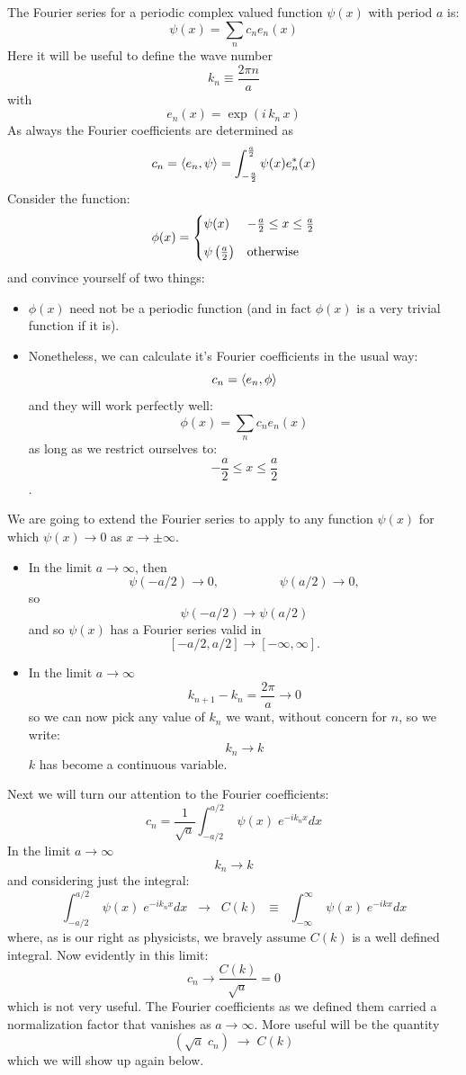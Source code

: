 \documentclass[12pt]{book}
\begin{document}
The Fourier series for a periodic complex valued function $\psi(x)$ with period $a$ is:
\begin{equation*}
\psi(x) = \sum_n c_n e_n(x)
\end{equation*}
Here it will be useful to define the wave number
\begin{equation}
k_n \equiv \frac{2 \pi n}{a}
\end{equation}
with 
$$e_n(x) = \exp( i\, k_n \, x)$$
As always the Fourier coefficients are determined as 
\begin{equation*}
c_n = \braket{e_n, \psi} = \int_{-\frac{a}{2}}^{\frac{a}{2}} \psi(x) e_n^*(x)
\end{equation*}
Consider the function:
\begin{equation}
\phi(x) =
\begin{cases}
   \psi(x)                      & -\frac{a}{2} \leq x \leq \frac{a}{2} \\[8pt]
   \psi\left(\frac{a}{2}\right) & {\rm otherwise} \\
\end{cases}
\end{equation}
and convince yourself of two things:
\begin{itemize}
 \item $\phi(x)$ need not be a periodic function (and in fact $\phi(x)$ is a very trivial function if it is).
 \item Nonetheless, we can calculate it's Fourier coefficients in the usual way:
$$c_n = \braket{e_n, \phi}$$
and they will work perfectly well:
$$\phi(x) = \sum_n c_n e_n(x)$$
as long as we restrict ourselves to:
$$-\frac{a}{2} \leq x \leq \frac{a}{2}$$.
\end{itemize}   
We are going to extend the Fourier series to apply to any function $\psi(x)$ for which $\psi(x) \to 0$ as $x \to \pm\infty$.
\begin{itemize}
 \item In the limit $a \to \infty$, then 
 $$\psi(-a/2) \to 0, \hspace{2cm } \psi(a/2) \to 0,$$
 so
 $$\psi(-a/2) \to \psi(a/2)$$
 and so $\psi(x)$ has a Fourier series valid in 
 $$[-a/2,a/2] \to [-\infty,\infty].$$
 \item In the limit $a \to \infty$
 $$k_{n+1}-k_n = \frac{2\pi}{a} \to 0$$
 so we can now pick any value of $k_n$ we want, without concern for $n$, so we write:
 $$k_n \to k$$
 $k$ has become a continuous variable.
\end{itemize}
Next we will turn our attention to the Fourier coefficients:
$$c_n = \frac{1}{\sqrt{a}} \int_{-a/2}^{a/2} \; \psi(x) \; e^{-ik_nx} dx$$
In the limit $a \to \infty$
$$k_n \to k$$
and considering just the integral:
$$\int_{-a/2}^{a/2} \; \psi(x) \; e^{-ik_nx} dx \;\; \to \;\; C(k) \;\; \equiv \;\; \int_{-\infty}^{\infty} \; \psi(x) \; e^{-ikx} dx$$
where, as is our right as physicists, we bravely assume $C(k)$ is a well defined integral.
Now evidently in this limit:
$$c_n \to \frac{C(k)}{\sqrt{a}} = 0$$
which is not very useful.  The Fourier coefficients as we defined them carried a normalization factor that vanishes as $a \to \infty$.  More useful will be the quantity
$$ \left(\sqrt{a} \; c_n \right) \; \to \; C(k) $$
which we will show up again below.
\end{document}
